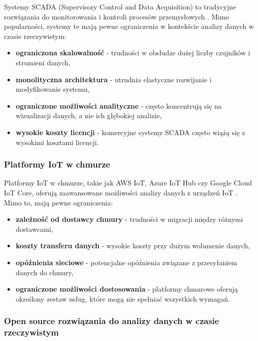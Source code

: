 Systemy SCADA (Supervisory Control and Data Acquisition) to tradycyjne rozwiązania do monitorowania i kontroli procesów przemysłowych \cite{scada}.
Mimo popularności, systemy te mają pewne ograniczenia w kontekście analizy danych w czasie rzeczywistym:

\begin{itemize}
    \item \textbf{ograniczona skalowalność} - trudności w obsłudze dużej liczby czujników i strumieni danych,
    \item \textbf{monolityczna architektura} - utrudnia elastyczne rozwijanie i modyfikowanie systemu,
    \item \textbf{ograniczone możliwości analityczne} - często koncentrują się na wizualizacji danych, a nie ich głębokiej analizie,
    \item \textbf{wysokie koszty licencji} - komercyjne systemy SCADA często wiążą się z wysokimi kosztami licencji.
\end{itemize}

\subsubsection{Platformy IoT w chmurze}
\label{subsubsec:cloud_iot}

Platformy IoT w chmurze, takie jak AWS IoT, Azure IoT Hub czy Google Cloud IoT Core, oferują zaawansowane możliwości analizy danych z
urządzeń IoT \cite{cloud_iot}. Mimo to, mają pewne ograniczenia:

\begin{itemize}
    \item \textbf{zależność od dostawcy chmury} - trudności w migracji między różnymi dostawcami,
    \item \textbf{koszty transferu danych} - wysokie koszty przy dużym wolumenie danych,
    \item \textbf{opóźnienia sieciowe} - potencjalne opóźnienia związane z przesyłaniem danych do chmury,
    \item \textbf{ograniczone możliwości dostosowania} - platformy chmurowe oferują określony zestaw usług, które mogą nie spełniać wszystkich wymagań.
\end{itemize}

\subsubsection{Open source rozwiązania do analizy danych w czasie rzeczywistym}
\label{subsubsec:open_source}

